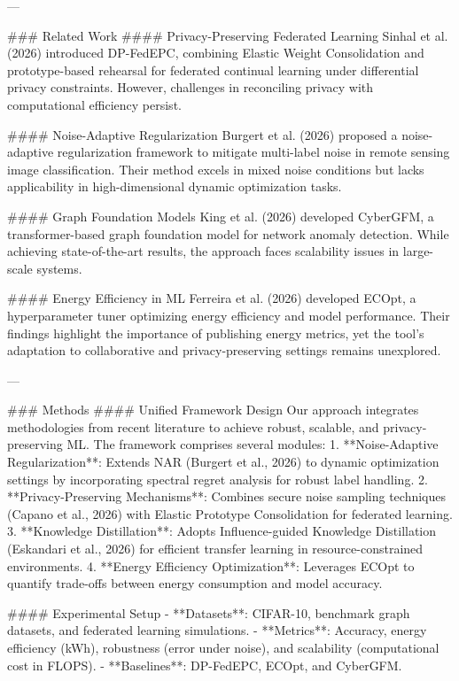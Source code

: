 ---

### Related Work
#### Privacy-Preserving Federated Learning
Sinhal et al. (2026) introduced DP-FedEPC, combining Elastic Weight Consolidation and prototype-based rehearsal for federated continual learning under differential privacy constraints. However, challenges in reconciling privacy with computational efficiency persist.

#### Noise-Adaptive Regularization
Burgert et al. (2026) proposed a noise-adaptive regularization framework to mitigate multi-label noise in remote sensing image classification. Their method excels in mixed noise conditions but lacks applicability in high-dimensional dynamic optimization tasks.

#### Graph Foundation Models
King et al. (2026) developed CyberGFM, a transformer-based graph foundation model for network anomaly detection. While achieving state-of-the-art results, the approach faces scalability issues in large-scale systems.

#### Energy Efficiency in ML
Ferreira et al. (2026) developed ECOpt, a hyperparameter tuner optimizing energy efficiency and model performance. Their findings highlight the importance of publishing energy metrics, yet the tool's adaptation to collaborative and privacy-preserving settings remains unexplored.

---

### Methods
#### Unified Framework Design
Our approach integrates methodologies from recent literature to achieve robust, scalable, and privacy-preserving ML. The framework comprises several modules:
1. **Noise-Adaptive Regularization**: Extends NAR (Burgert et al., 2026) to dynamic optimization settings by incorporating spectral regret analysis for robust label handling.
2. **Privacy-Preserving Mechanisms**: Combines secure noise sampling techniques (Capano et al., 2026) with Elastic Prototype Consolidation for federated learning.
3. **Knowledge Distillation**: Adopts Influence-guided Knowledge Distillation (Eskandari et al., 2026) for efficient transfer learning in resource-constrained environments.
4. **Energy Efficiency Optimization**: Leverages ECOpt to quantify trade-offs between energy consumption and model accuracy.

#### Experimental Setup
- **Datasets**: CIFAR-10, benchmark graph datasets, and federated learning simulations.
- **Metrics**: Accuracy, energy efficiency (kWh), robustness (error under noise), and scalability (computational cost in FLOPS).
- **Baselines**: DP-FedEPC, ECOpt, and CyberGFM.

